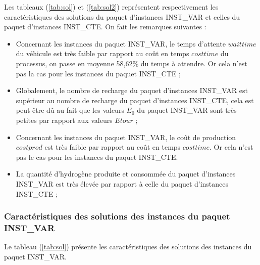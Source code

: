 {Les tableaux (\ref{tab:sol}) et (\ref{tab:sol2}) représentent respectivement les caractéristiques des solutions du paquet d'instances INST\_VAR et celles du paquet d'instances INST\_CTE.
On fait les remarques suivantes :
\begin{itemize}[label=$\square$]
	\item Concernant les instances du paquet INST\_VAR, le temps d'attente $wait time$ du véhicule est très faible par rapport au coût en temps $cost time$ du processus, on passe en moyenne 58,62\% du temps à attendre. Or cela n'est pas la cas pour les instances du paquet INST\_CTE ;
	\item Globalement, le nombre de recharge du paquet d'instances INST\_VAR est supérieur au nombre de recharge du paquet d'instances INST\_CTE, cela est peut-être dû au fait que les valeurs $E_0$ du paquet INST\_VAR sont très petites par rapport aux valeurs $Etour$ ;
	\item  Concernant les instances du paquet INST\_VAR, le coût de production $cost prod$ est très faible par rapport au coût en temps $cost time$. Or cela n'est pas le cas pour les instances du paquet INST\_CTE. 
	\item La quantité d'hydrogène produite et consommée du paquet d'instances INST\_VAR est très élevée par rapport à celle du paquet d'instances INST\_CTE ; 
\end{itemize}
\subsubsection{Caractéristiques des solutions des instances du paquet INST\_VAR}
Le tableau (\ref{tab:sol}) présente les caractéristiques des solutions des instances du paquet INST\_VAR. 



}
